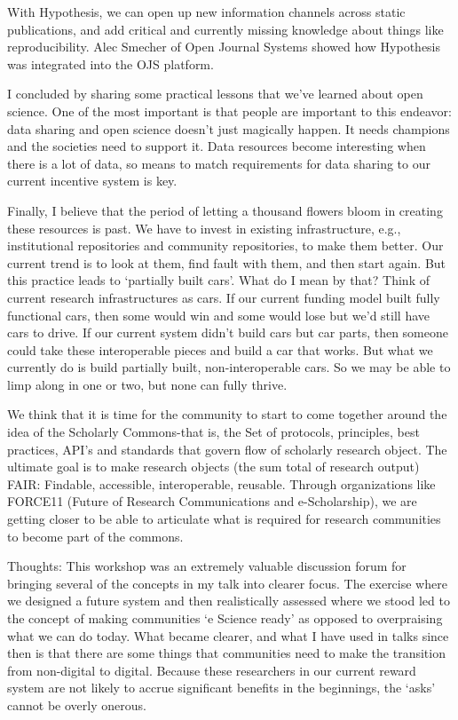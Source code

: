 \documentclass[a4paper,USenglish]{dagrep}
\begin{document}
With Hypothesis, we can open up new information channels across static
publications, and add critical and currently missing knowledge about things like
reproducibility.  Alec Smecher of Open Journal Systems showed how Hypothesis was
integrated into the OJS platform.

I concluded by sharing some practical lessons that we've learned about open
science.  One of the most important is that people are important to this
endeavor:  data sharing and open science doesn't just magically happen.  It
needs champions and the societies need to support it.  Data resources become
interesting when there is a lot of data, so means to match requirements for data
sharing to our current incentive system is key.  

Finally, I believe that the period of letting a thousand flowers bloom in
creating these resources is past.  We have to invest in existing infrastructure,
e.g., institutional repositories and community repositories, to make them
better.  Our current trend is to look at them, find fault with them, and then
start again.  But this practice leads to `partially built cars'.  What do I mean
by that?  Think of current research infrastructures as cars.  If our current
funding model built fully functional cars, then some would win and some would
lose but we'd still have cars to drive.  If our current system didn't build cars
but car parts, then someone could take these interoperable pieces and build a
car that works.  But what we currently do is build partially built,
non-interoperable cars.  So we may be able to limp along in one or two, but none
can fully thrive.

We think that it is time for the community to start to come together around the
idea of the Scholarly Commons-that is, the Set of protocols, principles, best
practices, API's and standards that govern flow of scholarly research object. 
The ultimate goal is to make research objects (the sum total of research output)
FAIR:  Findable, accessible, interoperable, reusable.  Through organizations
like FORCE11 (Future of Research Communications and e-Scholarship), we are
getting closer to be able to articulate what is required for research
communities to become part of the commons.  

Thoughts:  This workshop was an extremely valuable discussion forum for bringing
several of the concepts in my talk into clearer focus.  The exercise where we
designed a future system and then realistically assessed where we stood led to
the concept of making communities `e Science ready' as opposed to overpraising
what we can do today.  What became clearer, and what I have used in talks since
then is that there are some things that communities need to make the transition
from non-digital to digital.  Because these researchers in our current reward
system are not likely to accrue significant benefits in the beginnings, the
`asks' cannot be overly onerous.  
\end{document}
